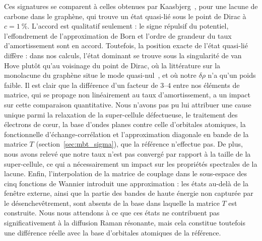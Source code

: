 Ces signatures se comparent à celles obtenues par Kaasbjerg~\cite{kaasbjergAtomisticMatrixTheory2020}, pour une lacune de carbone dans le graphène, qui trouve un état quasi-lié sous le point de Dirac à $c=1~\%$. L'accord est qualitatif seulement : le signe répulsif du potentiel, l'effondrement de l'approximation de Born et l'ordre de grandeur du taux d'amortissement sont en accord. Toutefois, la position exacte de l'état quasi-lié diffère : dans nos calculs, l'état dominant se trouve sous la singularité de van Hove plutôt qu'au voisinage du point de Dirac, où la littérature sur la monolacune du graphène situe le mode quasi-nul~\cite{pereiraDisorderInducedLocalized2006}, et où notre $\delta\rho$ n'a qu'un poids faible. Il est clair que la différence d'un facteur de $3$--$4$ entre nos éléments de matrice, qui se propage non linéairement au taux d'amortissement, a un impact sur cette comparaison quantitative. Nous n'avons pas pu lui attribuer une cause unique parmi la relaxation de la super-cellule défectueuse, le traitement des électrons de c\oe ur, la base d'ondes planes contre celle d'orbitales atomiques, la fonctionnelle d'échange-corrélation et l'approximation diagonale en bande de la matrice $T$ (section~\ref{sec:mbt_sigma}), que la référence n'effectue pas. De plus, nous avons relevé que notre taux n'est pas convergé par rapport à la taille de la super-cellule, ce qui a nécessairement un impact sur les propriétés spectrales de la lacune. Enfin, l'interpolation de la matrice de couplage dans le sous-espace des cinq fonctions de Wannier introduit une approximation : les états au-delà de la fenêtre externe, ainsi que la partie des bandes de haute énergie non capturée par le désenchevêtrement, sont absents de la base dans laquelle la matrice $T$ est construite. Nous nous attendons à ce que ces états ne contribuent pas significativement à la diffusion Raman résonante, mais cela constitue toutefois une différence réelle avec la base d'orbitales atomiques de la référence.

